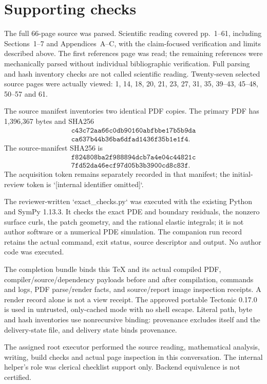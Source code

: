 \documentclass[10pt]{article}
\begin{document}
\section*{Supporting checks}
The full 66-page source was parsed. Scientific reading covered pp. 1–61, including Sections 1–7 and Appendices A–C, with the claim-focused verification and limits described above. The first references page was read; the remaining references were mechanically parsed without individual bibliographic verification. Full parsing and hash inventory checks are not called scientific reading. Twenty-seven selected source pages were actually viewed: 1, 14, 18, 20, 21, 23, 27, 31, 35, 39–43, 45–48, 50–57 and 61.\par
The source manifest inventories two identical PDF copies. The primary PDF has 1,396,367 bytes and SHA256 \[\begin{gathered}
 \texttt{c43c72aa66c0db90160abfbbe17b5b9da}\\
 \texttt{ca637b44b36ba6dfad1436f35b1e1f4}.
\end{gathered}\] The source-manifest SHA256 is \[\begin{gathered}
 \texttt{f824808ba2f988894dcb7a4e04c44821c}\\
 \texttt{7fd52da46ecf97d05b3b3900cd8c83f}.
\end{gathered}\] The acquisition token remains separately recorded in that manifest; the initial-review token is `[internal identifier omitted]`.\par
The reviewer-written `exact\_checks.py` was executed with the existing Python and SymPy 1.13.3. It checks the exact PDE and boundary residuals, the nonzero surface curls, the patch geometry, and the rational elastic integrals; it is not author software or a numerical PDE simulation. The companion run record retains the actual command, exit status, source descriptor and output. No author code was executed.\par
The completion bundle binds this TeX and its actual compiled PDF, compiler/source/dependency payloads before and after compilation, commands and logs, PDF parse/render facts, and source/report image inspection receipts. A render record alone is not a view receipt. The approved portable Tectonic 0.17.0 is used in untrusted, only-cached mode with no shell escape. Literal path, byte and hash inventories use nonrecursive binding: provenance excludes itself and the delivery-state file, and delivery state binds provenance.\par
The assigned root executor performed the source reading, mathematical analysis, writing, build checks and actual page inspection in this conversation. The internal helper’s role was clerical checklist support only. Backend equivalence is not certified.\par
\end{document}
